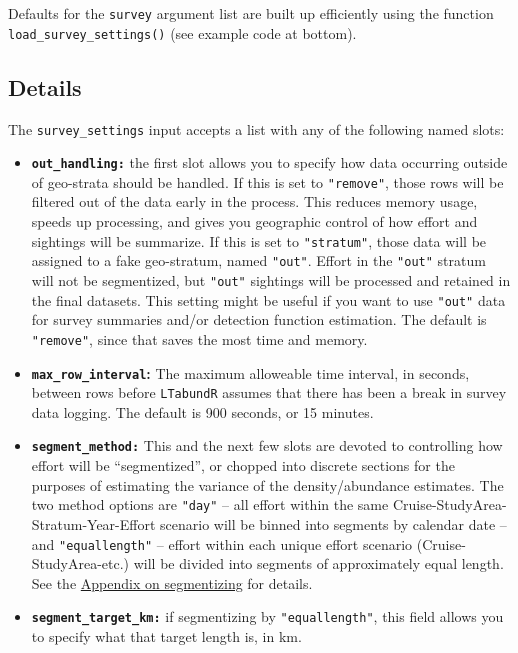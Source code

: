 \documentclass[
]{book}
\begin{document}
Defaults for the \texttt{survey} argument list are built up efficiently using the function \texttt{load\_survey\_settings()} (see example code at bottom).

\hypertarget{details}{%
\subsection*{Details}\label{details}}

The \texttt{survey\_settings} input accepts a list with any of the following named slots:

\begin{itemize}
\item
  \textbf{\texttt{out\_handling:}} the first slot allows you to specify how data occurring outside of geo-strata should be handled. If this is set to \texttt{"remove"}, those rows will be filtered out of the data early in the process. This reduces memory usage, speeds up processing, and gives you geographic control of how effort and sightings will be summarize. If this is set to \texttt{"stratum"}, those data will be assigned to a fake geo-stratum, named \texttt{"out"}. Effort in the \texttt{"out"} stratum will not be segmentized, but \texttt{"out"} sightings will be processed and retained in the final datasets. This setting might be useful if you want to use \texttt{"out"} data for survey summaries and/or detection function estimation. The default is \texttt{"remove"}, since that saves the most time and memory.
\item
  \textbf{\texttt{max\_row\_interval}:} The maximum alloweable time interval, in seconds, between rows before \texttt{LTabundR} assumes that there has been a break in survey data logging. The default is 900 seconds, or 15 minutes.
\item
  \textbf{\texttt{segment\_method:}} This and the next few slots are devoted to controlling how effort will be ``segmentized'', or chopped into discrete sections for the purposes of estimating the variance of the density/abundance estimates. The two method options are \texttt{"day"} -- all effort within the same Cruise-StudyArea-Stratum-Year-Effort scenario will be binned into segments by calendar date -- and \texttt{"equallength"} -- effort within each unique effort scenario (Cruise-StudyArea-etc.) will be divided into segments of approximately equal length. See the \protect\hyperlink{segmentizing}{Appendix on segmentizing} for details.
\item
  \textbf{\texttt{segment\_target\_km:}} if segmentizing by \texttt{"equallength"}, this field allows you to specify what that target length is, in km.

\end{itemize}
\end{document}
